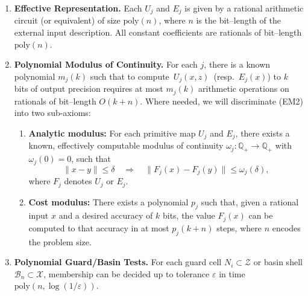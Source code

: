 \documentclass{article}
\theoremstyle{definition}
\theoremstyle{plain}
\begin{document}
\begin{enumerate}[label=(EM\arabic*), leftmargin=2em]
  \item \textbf{Effective Representation.}
        Each \(U_j\) and \(E_j\) is given by a rational arithmetic circuit (or equivalent) of size \(\mathrm{poly}(n)\), where \(n\) is the bit–length of the external input description.  All constant coefficients are rationals of bit–length \(\mathrm{poly}(n)\).

  \item \textbf{Polynomial Modulus of Continuity.}
        For each \(j\), there is a known polynomial \(m_j(k)\) such that to compute
        \(\,U_j(x,z)\,\) (resp.\ \(E_j(x)\)) to \(k\) bits of output precision requires at most
        \(m_j(k)\) arithmetic operations on rationals of bit–length \(O(k + n)\).
        Where needed, we will discriminate (EM2) into two sub-axioms:
        \begin{enumerate}[label=(EM2\alph*)]
            \item \textbf{Analytic modulus:}                     
                For each primitive map $U_j$ and $E_j$, there exists a known, effectively computable modulus of continuity $\omega_j : \mathbb{Q}_+ \to \mathbb{Q}_+$ with $\omega_j(0)=0$, such that
                \[
                \|x - y\| \le \delta \quad\Rightarrow\quad \|F_j(x) - F_j(y)\| \le \omega_j(\delta),
                \]
                where $F_j$ denotes $U_j$ or $E_j$.
            \item \textbf{Cost modulus:}            
                There exists a polynomial $p_j$ such that, given a rational input $x$ and a desired accuracy of $k$ bits, the value $F_j(x)$ can be computed to that accuracy in at most $p_j(k+n)$ steps, where $n$ encodes the problem size.
        \end{enumerate}

  \item \textbf{Polynomial Guard/Basin Tests.}
        For each guard cell \(N_i\subset\mathcal Z\) or basin shell \(\mathcal B_n\subset\mathcal X\),
        membership can be decided up to tolerance \(\varepsilon\) in time
        \(\mathrm{poly}(n,\log(1/\varepsilon))\).
\end{enumerate}
\end{document}
